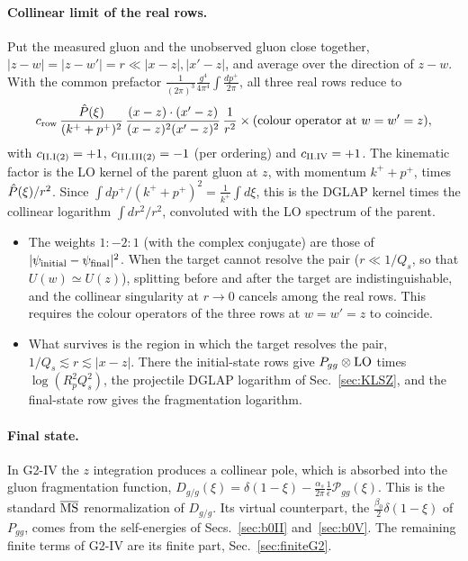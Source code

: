\paragraph*{Collinear limit of the real rows.} Put the measured gluon and the unobserved gluon close together, $|z-w|=|z-w'|=r\ll|x-z|,|x'-z|$, and average over the direction of $z-w$. With the common prefactor $\frac{1}{(2\pi)^3}\frac{g^4}{4\pi^4}\int\frac{dp^+}{2\pi}$, all three real rows reduce to
\begin{equation}
c_{\rm row}\,\frac{\hat P(\xi)}{(k^++p^+)^2}\,\frac{(x-z)\cdot(x'-z)}{(x-z)^2(x'-z)^2}\,\frac{1}{r^2}\times(\text{colour operator at }w=w'=z),
\label{eq:collinear}
\end{equation}
with $c_{\rm II.I(2)}=+1$, $c_{\rm III.III(2)}=-1$ (per ordering) and $c_{\rm II.IV}=+1$. The kinematic factor is the LO kernel of the parent gluon at $z$, with momentum $k^++p^+$, times $\hat P(\xi)/r^2$. Since $\int dp^+/(k^++p^+)^2=\frac{1}{k^+}\int d\xi$, this is the DGLAP kernel times the collinear logarithm $\int dr^2/r^2$, convoluted with the LO spectrum of the parent.
\begin{itemize}
\item The weights $1:-2:1$ (with the complex conjugate) are those of $|\psi_{\rm initial}-\psi_{\rm final}|^2$. When the target cannot resolve the pair ($r\ll1/Q_s$, so that $U(w)\simeq U(z)$), splitting before and after the target are indistinguishable, and the collinear singularity at $r\to0$ cancels among the real rows. This requires the colour operators of the three rows at $w=w'=z$ to coincide.
\item What survives is the region in which the target resolves the pair, $1/Q_s\lesssim r\lesssim|x-z|$. There the initial-state rows give $P_{gg}\otimes{\rm LO}$ times $\log(R_p^2Q_s^2)$, the projectile DGLAP logarithm of Sec.~\ref{sec:KLSZ}, and the final-state row gives the fragmentation logarithm.
\end{itemize}

\paragraph*{Final state.} In G2-IV the $z$ integration produces a collinear pole, which is absorbed into the gluon fragmentation function, $D_{g/g}(\xi)=\delta(1-\xi)-\frac{\alpha_s}{2\pi}\frac{1}{\bar\epsilon}\mathcal P_{gg}(\xi)$. This is the standard $\overline{\rm MS}$ renormalization of $D_{g/g}$. Its virtual counterpart, the $\frac{\beta_0}{2}\delta(1-\xi)$ of $P_{gg}$, comes from the self-energies of Secs.~\ref{sec:b0II} and~\ref{sec:b0V}. The remaining finite terms of G2-IV are its finite part, Sec.~\ref{sec:finiteG2}.

